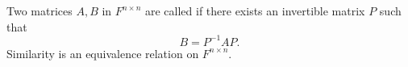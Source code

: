 Two matrices $A, B$ in $F^{n \times n}$ are called  if there exists an invertible matrix $P$ such that
$$
B = P^{-1} A P.
$$
Similarity is an equivalence relation on $F^{n \times n}$.
